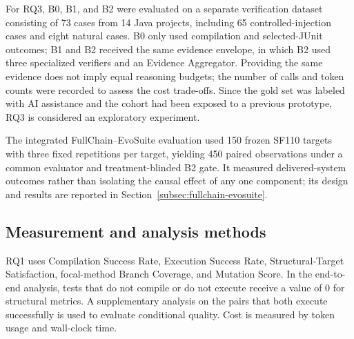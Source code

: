 \documentclass[pdflatex,sn-basic,Numbered,iicol]{sn-jnl}
\begin{document}
For RQ3, B0, B1, and B2 were evaluated on a separate verification dataset consisting of 73 cases from 14 Java projects, including 65 controlled-injection cases and eight natural cases. B0 only used compilation and selected-JUnit outcomes; B1 and B2 received the same evidence envelope, in which B2 used three specialized verifiers and an Evidence Aggregator. Providing the same evidence does not imply equal reasoning budgets; the number of calls and token counts were recorded to assess the cost trade-offs. Since the gold set was labeled with AI assistance and the cohort had been exposed to a previous prototype, RQ3 is considered an exploratory experiment.

The integrated FullChain--EvoSuite evaluation used 150 frozen SF110 targets with three fixed repetitions per target, yielding 450 paired observations under a common evaluator and treatment-blinded B2 gate. It measured delivered-system outcomes rather than isolating the causal effect of any one component; its design and results are reported in Section~\ref{subsec:fullchain-evosuite}.

\subsection{Measurement and analysis methods}\label{subsec:measurement}

RQ1 uses Compilation Success Rate, Execution Success Rate, Structural-Target Satisfaction, focal-method Branch Coverage, and Mutation Score. In the end-to-end analysis, tests that do not compile or do not execute receive a value of 0 for structural metrics. A supplementary analysis on the pairs that both execute successfully is used to evaluate conditional quality. Cost is measured by token usage and wall-clock time.
\end{document}
